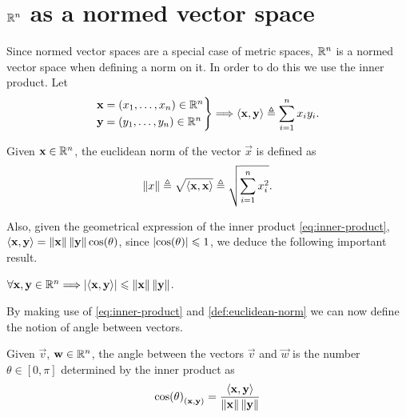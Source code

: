 \section{$\Rtn$ as a normed vector space}

Since normed vector spaces are a special case of metric spaces, $\Rtn$ is a normed vector space when defining a norm on it. In 
order to do this we use the inner product. Let
\begin{equation}\label{eq:inner-product}
\begin{rcases}
\vec{x} = \left(x_1, \ldots, x_n\right)\in\Rtn \\
\vec{y} = \left(y_1, \ldots, y_n\right)\in\Rtn
\end{rcases}
\implies\innerp{\vec{x}, \vec{y}} \bydef \sum_{i=1}^n x_i y_i.
\end{equation}

\begin{defn}\label{def:euclidean-norm}
	Given $\vec{x}\in\Rtn$, the euclidean norm of the vector $\vec{x}$ is defined as
	\begin{equation}
		\left\Vert x \right\Vert\triangleq\sqrt{\langle \mathbf{x}, \mathbf{x} \rangle}\triangleq\sqrt{\sum_{i=1}^n x_i^2}.
	\end{equation}
\end{defn}


Also, given the geometrical expression of the inner product \eqref{eq:inner-product}, $\langle \mathbf{x}, \mathbf{y} \rangle = \left\Vert \mathbf{x} \right\Vert
\left\Vert \mathbf{y} \right\Vert\cos(\theta)$, since $\abs{\cos(\theta)}\leqslant 1$, we deduce the following important result.
\begin{lemma}
$\forall\vec{x}, \vec{y}\in\Rtn \implies \abs{\innerp{\vec{x}, \vec{y}}}\leq \vnorm{\vec{x}}\vnorm{\vec{y}}$.
\end{lemma}


By making use of \ref{eq:inner-product} and \ref{def:euclidean-norm} we can now define the notion of angle between vectors.

\begin{defn}
Given $\vec{v}$, $\vec{w}\in\Rtn$, the angle between the vectors $\vec{v}$ and $\vec{w}$ is the number $\theta\in[0, \pi]$ 
determined by the inner product as
\begin{equation}
\cos(\theta)_{\left(\mathbf{x}, \mathbf{y}\right)} = \frac{\langle \mathbf{x}, \mathbf{y} \rangle}{\left\Vert \mathbf{x} \right\Vert\left\Vert \mathbf{y} \right\Vert}
\end{equation}
\end{defn}


